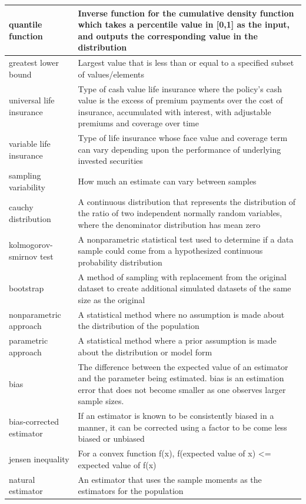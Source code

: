\documentclass[
]{book}
\begin{document}
\begin{longtable}{>{\raggedright\arraybackslash}p{10em}|>{\raggedright\arraybackslash}p{30em}}
\hline
quantile function & Inverse function for the cumulative density function which takes a percentile value in [0,1] as the input, and outputs the corresponding value in the distribution\\
\hline
greatest lower bound & Largest value that is less than or equal to a specified subset of values/elements\\
\hline
universal life insurance & Type of cash value life insurance where the policy's cash value is the excess of premium payments over the cost of insurance, accumulated with interest, with adjustable premiums and coverage over time\\
\hline
variable life insurance & Type of life insurance whose face value and coverage term can vary depending upon the performance of underlying invested securities\\
\hline
sampling variability & How much an estimate can vary between samples\\
\hline
cauchy distribution & A continuous distribution that represents the distribution of the ratio of two independent normally random variables, where the denominator distribution has mean zero\\
\hline
kolmogorov-smirnov test & A nonparametric statistical test used to determine if a data sample could come from a hypothesized continuous probability distribution\\
\hline
bootstrap & A method of sampling with replacement from the original dataset to create additional simulated datasets of the same size as the original\\
\hline
nonparametric approach & A statistical method where no assumption is made about the distribution of the population\\
\hline
parametric approach & A statistical method where a prior assumption is made about the distribution or model form\\
\hline
bias & The difference between the expected value of an estimator and the parameter being estimated. bias is an estimation error that does not become smaller as one observes larger sample sizes.\\
\hline
bias-corrected estimator & If an estimator is known to be consistently biased in a manner, it can be corrected using a factor to be come less biased or unbiased\\
\hline
jensen inequality & For a convex function f(x), f(expected value of x) <= expected value of f(x)\\
\hline
natural estimator & An estimator that uses the sample moments as the estimators for the population\\

\end{longtable}
\end{document}
